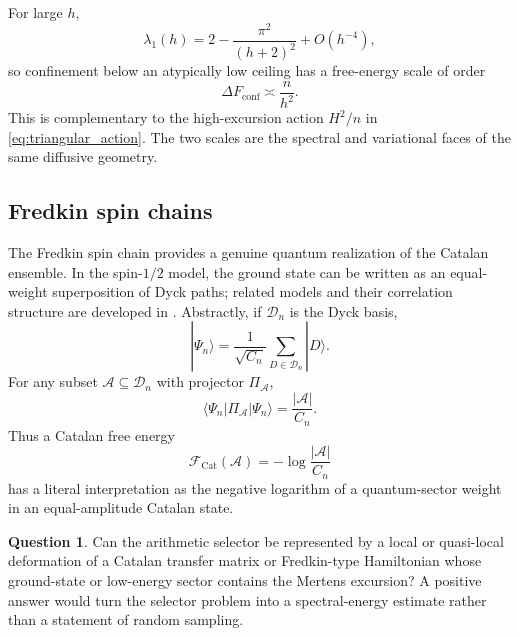\documentclass[11pt]{amsart}
\numberwithin{equation}{section}
\theoremstyle{plain}
\theoremstyle{definition}
\newtheorem{question}[theorem]{Question}
\theoremstyle{remark}
\newcommand{\Cat}{C}
\newcommand{\D}{\mathcal{D}}
\newcommand{\Fcat}{\mathcal{F}_{\mathrm{Cat}}}
\begin{document}
For large $h$,
\begin{equation}
\lambda_1(h)
=
2-\frac{\pi^2}{(h+2)^2}+O(h^{-4}),
\label{eq:ground_eigenvalue_expansion}
\end{equation}
so confinement below an atypically low ceiling has a free-energy scale of order
\begin{equation}
\Delta F_{\mathrm{conf}}
\asymp
\frac{n}{h^2}.
\label{eq:confinement_free_energy}
\end{equation}
This is complementary to the high-excursion action $H^2/n$ in \eqref{eq:triangular_action}.  The two scales are the spectral and variational faces of the same diffusive geometry.

\subsection{Fredkin spin chains}
\label{subsec:fredkin}

The Fredkin spin chain provides a genuine quantum realization of the Catalan ensemble.  In the spin-$1/2$ model, the ground state can be written as an equal-weight superposition of Dyck paths; related models and their correlation structure are developed in \cite{DellAnnaEtAl2016,SalbergerKorepin2017}.  Abstractly, if $\D_n$ is the Dyck basis,
\begin{equation}
|\Psi_n\rangle
=
\frac{1}{\sqrt{\Cat_n}}
\sum_{D\in\D_n}|D\rangle.
\label{eq:fredkin_catalan_state}
\end{equation}
For any subset $\mathcal{A}\subseteq\D_n$ with projector $\Pi_{\mathcal A}$,
\begin{equation}
\langle\Psi_n|\Pi_{\mathcal A}|\Psi_n\rangle
=
\frac{|\mathcal A|}{\Cat_n}.
\label{eq:sector_weight_quantum}
\end{equation}
Thus a Catalan free energy
\begin{equation}
\Fcat(\mathcal A)
=
-\log\frac{|\mathcal A|}{\Cat_n}
\label{eq:catalan_free_energy_sector}
\end{equation}
has a literal interpretation as the negative logarithm of a quantum-sector weight in an equal-amplitude Catalan state.

\begin{question}
\label{question:arithmetic_hamiltonian}
Can the arithmetic selector be represented by a local or quasi-local deformation of a Catalan transfer matrix or Fredkin-type Hamiltonian whose ground-state or low-energy sector contains the Mertens excursion?  A positive answer would turn the selector problem into a spectral-energy estimate rather than a statement of random sampling.
\end{question}
\end{document}
